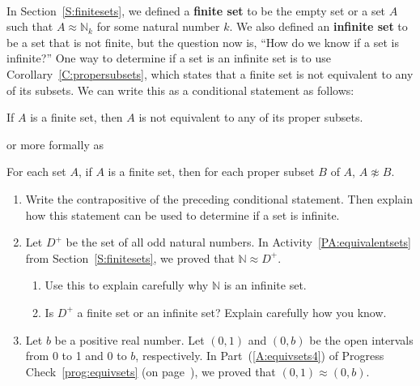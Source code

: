 \begin{previewactivity}\label{PA:introtoinfinite} \hfill \\
In Section~\ref{S:finitesets}, we defined a \textbf{finite set}
%
 to be the empty set or a set $A$ such that $A \approx \mathbb{N}_k$ for some natural number $k$.    We also defined an 
\textbf{infinite set} 
%
to be a set that is not finite, but the question now is, ``How do we know if a set is infinite?''  
One way to determine if a set is an infinite set is to use 
Corollary~\ref{C:propersubsets}, which states that a finite set is not equivalent to any of its subsets.  We can write this as a conditional statement as follows:

\begin{list}{}
\item If $A$ is a finite set, then $A$ is not equivalent to any of its proper subsets.
\end{list}
\noindent
or more formally as
\begin{list}{}
\item For each set $A$, if $A$ is a finite set, then for each proper subset $B$ of $A$, $A \not\approx B$.
\end{list}

\begin{enumerate}
\item Write the contrapositive of the preceding conditional statement.  Then explain how this statement can be used to determine if a set is infinite.

\item Let $D^+$ be the set of all odd natural numbers.  In \typeu Activity~\ref*{PA:equivalentsets} from Section~\ref{S:finitesets}, we proved that $\mathbb{N} \approx D^+$. 
\label{PA:introtoinfinite2}%

\begin{enumerate}
\item Use this to explain carefully why $\mathbb{N}$ is an infinite set.

\item Is $D^+$ a finite set or an infinite set?  Explain carefully  how you know.
\end{enumerate}

\item Let $b$ be a positive real number.  Let $( 0, 1 )$ and 
$( 0, b )$ be the open intervals from 0 to 1 and 0 to $b$, respectively.  In 
Part~(\ref{A:equivsets4}) of Progress Check~\ref{prog:equivsets} 
(on page~\pageref{prog:equivsets}), 
we proved that 
$( 0, 1 ) \approx ( 0, b )$. 
\label{PA:introtoinfinite3}%


\end{enumerate}
\end{previewactivity}
